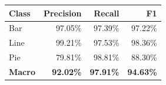 \begin{tabular}{@{}lrrr@{}}
\toprule
\textbf{Class} & \textbf{Precision} & \textbf{Recall} & \textbf{F1} \\
\midrule
Bar   & 97.05\% & 97.39\% & 97.22\% \\
Line  & 99.21\% & 97.53\% & 98.36\% \\
Pie   & 79.81\% & 98.81\% & 88.30\% \\
\midrule
\textbf{Macro} & \textbf{92.02\%} & \textbf{97.91\%} & \textbf{94.63\%} \\
\bottomrule
\end{tabular}
